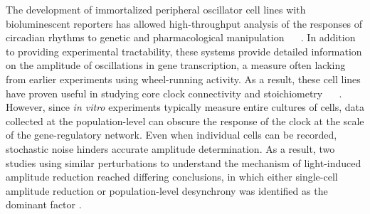 \documentclass[11pt, letterpaper]{article}
\providecommand{\DIFadd}[1]{{\protect\color{blue}#1}} %
\providecommand{\DIFaddbegin}{} %
\providecommand{\DIFaddend}{} %
\begin{document}
The development of immortalized peripheral oscillator cell lines with bioluminescent reporters has allowed high-throughput analysis of \DIFaddbegin \DIFadd{the responses of circadian rhythms }\DIFaddend to genetic and pharmacological manipulation \DIFaddbegin \DIFadd{\mbox{%
\cite{Hirota2010, Ramanathan2014}
}%
}\DIFaddend .
In addition to providing experimental tractability, these systems provide detailed information on the amplitude of oscillations in gene transcription, a measure often lacking from earlier experiments using wheel-running activity.
 As a result, these cell lines have proven useful in studying core clock connectivity and stoichiometry \DIFaddbegin \DIFadd{\mbox{%
\cite{Baggs2009}
}%
}\DIFaddend .
However, since {\itshape in vitro} experiments typically measure entire cultures of cells, data collected at \DIFaddbegin \DIFadd{the }\DIFaddend population-level can obscure the response of the clock at the scale of the gene-regulatory network.
Even when individual cells can be recorded, stochastic noise hinders accurate amplitude determination.
\DIFaddbegin \DIFadd{As a result, two }\DIFaddend studies using similar perturbations to understand the mechanism of light-induced amplitude reduction reached differing conclusions, in which either single-cell amplitude reduction or population-level desynchrony was identified as the dominant factor \cite{Pulivarthy2007, Ukai2007}.
\end{document}
